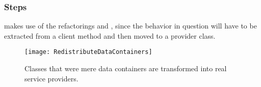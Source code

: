 \documentclass[a4paper,10pt,twoside]{book}
\begin{document}
\subsubsection*{Steps}

 makes use of the refactorings  and , since the behavior in question will have to be extracted from a client method and then moved to a provider class.

\begin{figure}
\begin{center}
\texttt{[image: RedistributeDataContainers]}
\caption{Classes that were mere data containers are transformed into real service providers.}
\end{center}
\end{figure}
\end{document}
